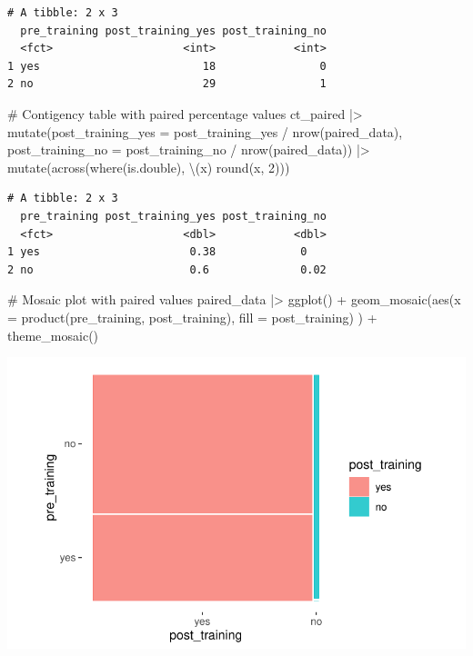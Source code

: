 \documentclass[
  letterpaper,
  DIV=11,
  numbers=noendperiod]{scrreprt}
\newenvironment{Shaded}{\begin{snugshade}}{\end{snugshade}}
\newcommand{\AttributeTok}[1]{\textcolor[rgb]{0.40,0.45,0.13}{#1}}
\newcommand{\CommentTok}[1]{\textcolor[rgb]{0.37,0.37,0.37}{#1}}
\newcommand{\DecValTok}[1]{\textcolor[rgb]{0.68,0.00,0.00}{#1}}
\newcommand{\FunctionTok}[1]{\textcolor[rgb]{0.28,0.35,0.67}{#1}}
\newcommand{\NormalTok}[1]{\textcolor[rgb]{0.00,0.23,0.31}{#1}}
\newcommand{\SpecialCharTok}[1]{\textcolor[rgb]{0.37,0.37,0.37}{#1}}
\begin{document}
\begin{verbatim}
# A tibble: 2 x 3
  pre_training post_training_yes post_training_no
  <fct>                    <int>            <int>
1 yes                         18                0
2 no                          29                1
\end{verbatim}

\begin{Shaded}
\begin{Highlighting}[]
\CommentTok{\# Contigency table with paired percentage values}
\NormalTok{ct\_paired }\SpecialCharTok{|\textgreater{}}
  \FunctionTok{mutate}\NormalTok{(}\AttributeTok{post\_training\_yes =}\NormalTok{ post\_training\_yes }\SpecialCharTok{/} \FunctionTok{nrow}\NormalTok{(paired\_data),}
         \AttributeTok{post\_training\_no =}\NormalTok{ post\_training\_no }\SpecialCharTok{/} \FunctionTok{nrow}\NormalTok{(paired\_data)) }\SpecialCharTok{|\textgreater{}}
  \FunctionTok{mutate}\NormalTok{(}\FunctionTok{across}\NormalTok{(}\FunctionTok{where}\NormalTok{(is.double), \textbackslash{}(x) }\FunctionTok{round}\NormalTok{(x, }\DecValTok{2}\NormalTok{)))}
\end{Highlighting}
\end{Shaded}

\begin{verbatim}
# A tibble: 2 x 3
  pre_training post_training_yes post_training_no
  <fct>                    <dbl>            <dbl>
1 yes                       0.38             0   
2 no                        0.6              0.02
\end{verbatim}

\begin{Shaded}
\begin{Highlighting}[]
\CommentTok{\# Mosaic plot with paired values}
\NormalTok{paired\_data }\SpecialCharTok{|\textgreater{}}
  \FunctionTok{ggplot}\NormalTok{() }\SpecialCharTok{+}
  \FunctionTok{geom\_mosaic}\NormalTok{(}\FunctionTok{aes}\NormalTok{(}\AttributeTok{x =} \FunctionTok{product}\NormalTok{(pre\_training, post\_training),}
                  \AttributeTok{fill =}\NormalTok{ post\_training)}
\NormalTok{              ) }\SpecialCharTok{+}
  \FunctionTok{theme\_mosaic}\NormalTok{()}
\end{Highlighting}
\end{Shaded}

\includegraphics{11_group_comparison_files/figure-pdf/mosaic-plot-paired-pre-post-training-1.pdf}
\end{document}
